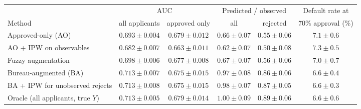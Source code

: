 \begin{tabular}{lccccc}
\toprule
 & \multicolumn{2}{c}{AUC} & \multicolumn{2}{c}{Predicted / observed} & Default rate at \\
\cmidrule(lr){2-3}\cmidrule(lr){4-5}
Method & all applicants & approved only & all & rejected & 70\% approval (\%) \\
\midrule
Approved-only (AO) & $0.693 \pm 0.004$ & $0.679 \pm 0.012$ & $0.66 \pm 0.07$ & $0.55 \pm 0.06$ & $7.1 \pm 0.6$ \\
AO + IPW on observables & $0.682 \pm 0.007$ & $0.663 \pm 0.011$ & $0.62 \pm 0.07$ & $0.50 \pm 0.08$ & $7.3 \pm 0.5$ \\
Fuzzy augmentation & $0.698 \pm 0.006$ & $0.677 \pm 0.008$ & $0.67 \pm 0.07$ & $0.56 \pm 0.06$ & $7.0 \pm 0.7$ \\
Bureau-augmented (BA) & $0.713 \pm 0.007$ & $0.675 \pm 0.015$ & $0.97 \pm 0.08$ & $0.86 \pm 0.06$ & $6.6 \pm 0.4$ \\
BA + IPW for unobserved rejects & $0.713 \pm 0.008$ & $0.675 \pm 0.015$ & $0.98 \pm 0.07$ & $0.87 \pm 0.05$ & $6.6 \pm 0.3$ \\
\midrule
Oracle (all applicants, true $Y$) & $0.713 \pm 0.005$ & $0.679 \pm 0.014$ & $1.00 \pm 0.09$ & $0.89 \pm 0.06$ & $6.6 \pm 0.6$ \\
\bottomrule
\end{tabular}
